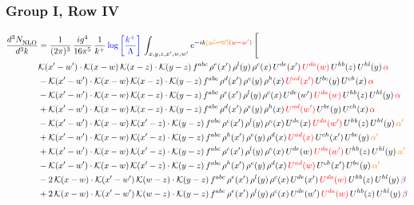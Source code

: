 \documentclass[9pt]{article}
\numberwithin{equation}{section}
\begin{document}
\subsubsection{Group I, Row IV}
\begin{align}
    \frac{d^{3}N_{\rm NLO}^{\rm}}{d^{3}k}  & = \frac{1}{(2\pi)^{3}}\, \frac{ig^{4}}{16\pi^{5}}\, \frac{1}{k^{+}}\, {\color{blue}\log{\left[\frac{k^{+}}{\Lambda}\right]}}\, \int_{x,y,z,x^{\prime},w,w^{\prime}}e^{-ik{\color{orange}\cancel{(w^{\prime}-w)}}{\color{red}(w-w^{\prime})}}\, \Bigg[\notag \\ & \mathcal{K}(x'-w')\cdot \mathcal{K}(x-w)\,\mathcal{K}(x-z)\cdot \mathcal{K}(y-z)\,f^{abc}\, \rho^{e}(x')\, \rho^{l}(y)\,\rho^{c}(x)\, U^{de}(x')\,{\color{red}U^{da}(w)}\,U^{hb}(z)\,U^{hl}(y)\, {\color{red}\alpha}\notag \\ & -\mathcal{K}(x'-w')\cdot \mathcal{K}(x-w)\,\mathcal{K}(x-z)\cdot \mathcal{K}(y-z)\,f^{abc}\, \rho^{d}(x')\, \rho^{e}(y)\,\rho^{h}(x)\, {\color{red}U^{ad}(x')}\,U^{be}(y)\,U^{ch}(x)\,{\color{red} \alpha}\notag \\ & -\mathcal{K}(x'-w')\cdot \mathcal{K}(x-w)\,\mathcal{K}(x-z)\cdot \mathcal{K}(y-z)\,f^{abc}\, \rho^{e}(x')\, \rho^{l}(y)\,\rho^{c}(x)\, U^{de}(w')\,{\color{red}U^{da}(w)}\,U^{hb}(z)\,U^{hl}(y)\,{\color{red} \alpha}\notag\\ & +\mathcal{K}(x'-w')\cdot \mathcal{K}(x-w)\,\mathcal{K}(x-z)\cdot \mathcal{K}(y-z)\,f^{abc}\, \rho^{d}(x')\, \rho^{e}(y)\,\rho^{h}(x)\, {\color{red}U^{ad}(w')}\,U^{be}(y)\,U^{ch}(x)\,{\color{red} \alpha}\notag\\ &-\mathcal{K}(x'-w')\cdot\mathcal{K}(x-w)\,\mathcal{K}(x'-z)\cdot\mathcal{K}(y-z)\, f^{abc}\,\rho^{c}(x')\,\rho^{l}(y)\,\rho^{e}(x)\,U^{de}(x)\,{\color{red}U^{da}(w')}\,U^{hb}(z)\,U^{hl}(y)\,{\color{orange} \alpha'}\notag\\ & +\mathcal{K}(x'-w')\cdot\mathcal{K}(x-w)\,\mathcal{K}(x'-z)\cdot\mathcal{K}(y-z)\, f^{abc}\,\rho^{h}(x')\,\rho^{e}(y)\,\rho^{d}(x)\,{\color{red}U^{ad}(x)}\,U^{ch}(x')\,U^{be}(y)\,{\color{orange} \alpha'}\notag\\
&+\mathcal{K}(x'-w')\cdot\mathcal{K}(x-w)\,\mathcal{K}(x'-z)\cdot\mathcal{K}(y-z)\, f^{abc}\,\rho^{c}(x')\,\rho^{l}(y)\,\rho^{e}(x)\,U^{de}(w)\,{\color{red}U^{da}(w')}\,U^{hb}(z)\,U^{hl}(y)\,{\color{orange} \alpha'}\notag \\ &-\mathcal{K}(x'-w')\cdot\mathcal{K}(x-w)\,\mathcal{K}(x'-z)\cdot\mathcal{K}(y-z)\, f^{abc}\,\rho^{h}(x')\,\rho^{e}(y)\,\rho^{d}(x)\,{\color{red}U^{ad}(w)}\,U^{ch}(x')\,U^{be}(y)\,{\color{orange} \alpha'}\notag \\ &  -2\,\mathcal{K}(x-w)\cdot \mathcal{K}(x'-w')\, \mathcal{K}(w-z)\cdot \mathcal{K}(y-z)\, f^{abc}\,\rho^{e}(x')\,\rho^{l}(y)\,\rho^{c}(x)\, U^{de}(x')\,{\color{red}U^{da}(w)}\,U^{hb}(z)\,U^{hl}(y)\,{\color{violet} \beta}\notag\\ & +2\,\mathcal{K}(x-w)\cdot \mathcal{K}(x'-w')\, \mathcal{K}(w-z)\cdot \mathcal{K}(y-z)\, f^{abc}\,\rho^{e}(x')\,\rho^{l}(y)\,\rho^{c}(x)\, U^{de}(w')\,{\color{red}U^{da}(w)}\,U^{hb}(z)\,U^{hl}(y)\,{\color{violet} \beta}\notag\\

\end{align}
\end{document}
